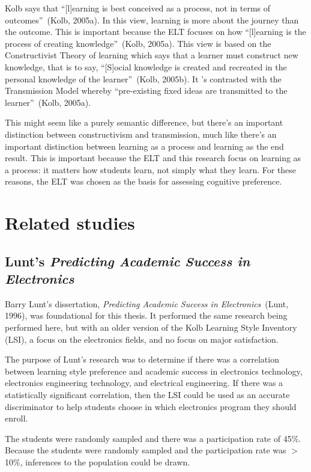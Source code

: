 Kolb says that ``[l]earning is best conceived as a process, not in terms of outcomes''~(Kolb, 2005a). In this view, learning is more about the journey than the outcome. This is important because the ELT focuses on how ``[l]earning is the process of creating knowledge''~(Kolb, 2005a). This view is based on the Constructivist Theory of learning which says that a learner must construct new knowledge, that is to say, ``[S]ocial knowledge is created and recreated in the personal knowledge of the learner''~(Kolb, 2005b). It 's contrasted with the Transmission Model whereby ``pre-existing fixed ideas are transmitted to the learner''~(Kolb, 2005a).

This might seem like a purely semantic difference, but there's an important distinction between constructivism and transmission, much like there's an important distinction between learning as a process and learning as the end result. This is important because the ELT and this research focus on learning as a process: it matters how students learn, not simply what they learn. For these reasons, the ELT was chosen as the basis for assessing cognitive preference.

\section{Related studies}
\subsection{Lunt's \textit{Predicting Academic Success in Electronics}}
Barry Lunt's dissertation, \textit{Predicting Academic Success in Electronics}~(Lunt, 1996), was foundational for this thesis. It performed the same research being performed here, but with an older version of the Kolb Learning Style Inventory (LSI), a focus on the electronics fields, and no focus on major satisfaction.

The purpose of Lunt's research was to determine if there was a correlation between learning style preference and academic success in electronics technology, electronics engineering technology, and electrical engineering. If there was a statistically significant correlation, then the LSI could be used as an accurate discriminator to help students choose in which electronics program they should enroll.

The students were randomly sampled and there was a participation rate of 45\%. Because the students were randomly sampled and the participation rate was $>$10\%, inferences to the population could be drawn.

